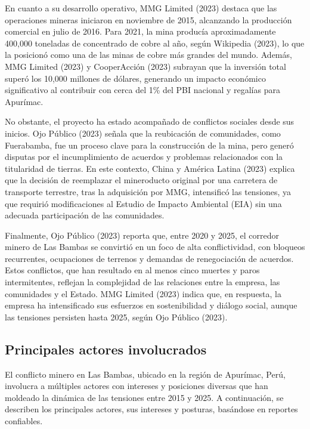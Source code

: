 \documentclass[
  stu,
  floatsintext,
  longtable,
  a4paper,
  nolmodern,
  notxfonts,
  notimes,
  colorlinks=true,linkcolor=blue,citecolor=blue,urlcolor=blue]{apa7}
\begin{document}
En cuanto a su desarrollo operativo, MMG Limited (2023) destaca que las
operaciones mineras iniciaron en noviembre de 2015, alcanzando la
producción comercial en julio de 2016. Para 2021, la mina producía
aproximadamente 400,000 toneladas de concentrado de cobre al año, según
Wikipedia (2023), lo que la posicionó como una de las minas de cobre más
grandes del mundo. Además, MMG Limited (2023) y CooperAcción (2023)
subrayan que la inversión total superó los 10,000 millones de dólares,
generando un impacto económico significativo al contribuir con cerca del
1\% del PBI nacional y regalías para Apurímac.

No obstante, el proyecto ha estado acompañado de conflictos sociales
desde sus inicios. Ojo Público (2023) señala que la reubicación de
comunidades, como Fuerabamba, fue un proceso clave para la construcción
de la mina, pero generó disputas por el incumplimiento de acuerdos y
problemas relacionados con la titularidad de tierras. En este contexto,
China y América Latina (2023) explica que la decisión de reemplazar el
mineroducto original por una carretera de transporte terrestre, tras la
adquisición por MMG, intensificó las tensiones, ya que requirió
modificaciones al Estudio de Impacto Ambiental (EIA) sin una adecuada
participación de las comunidades.

Finalmente, Ojo Público (2023) reporta que, entre 2020 y 2025, el
corredor minero de Las Bambas se convirtió en un foco de alta
conflictividad, con bloqueos recurrentes, ocupaciones de terrenos y
demandas de renegociación de acuerdos. Estos conflictos, que han
resultado en al menos cinco muertes y paros intermitentes, reflejan la
complejidad de las relaciones entre la empresa, las comunidades y el
Estado. MMG Limited (2023) indica que, en respuesta, la empresa ha
intensificado sus esfuerzos en sostenibilidad y diálogo social, aunque
las tensiones persisten hasta 2025, según Ojo Público (2023).

\subsection{Principales actores
involucrados}\label{principales-actores-involucrados}

El conflicto minero en Las Bambas, ubicado en la región de Apurímac,
Perú, involucra a múltiples actores con intereses y posiciones diversas
que han moldeado la dinámica de las tensiones entre 2015 y 2025. A
continuación, se describen los principales actores, sus intereses y
posturas, basándose en reportes confiables.
\end{document}
